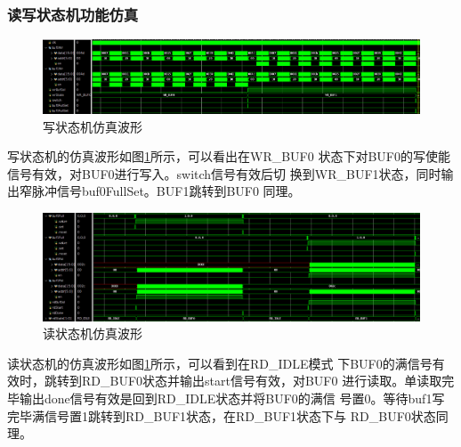 \documentclass{article}
\numberwithin {equation}{section}
\begin{document}
\begin{spacing}{1.25}
    \subsubsection{读写状态机功能仿真}
      \vspace{1em}
      \begin{figure}[H]
        \centering
        \includegraphics[scale=0.25]{./pictures/wrFSMSim.png}
        \caption{写状态机仿真波形}
        \label{WRFSMSimWave}
      \end{figure}
      写状态机的仿真波形如图\ref{WRFSMSimWave}所示，可以看出在WR\_BUF0
      状态下对BUF0的写使能信号有效，对BUF0进行写入。switch信号有效后切
      换到WR\_BUF1状态，同时输出窄脉冲信号buf0FullSet。BUF1跳转到BUF0
      同理。
      
      \begin{figure}[H]
        \centering
        \includegraphics[scale=0.25]{./pictures/rdFSMSim.png}
        \caption{读状态机仿真波形}
        \label{RdFSMSimWave}
      \end{figure}
      读状态机的仿真波形如图\ref{WRFSMSimWave}所示，可以看到在RD\_IDLE模式
      下BUF0的满信号有效时，跳转到RD\_BUF0状态并输出start信号有效，对BUF0
      进行读取。单读取完毕输出done信号有效是回到RD\_IDLE状态并将BUF0的满信
      号置0。等待buf1写完毕满信号置1跳转到RD\_BUF1状态，在RD\_BUF1状态下与
      RD\_BUF0状态同理。

\end{spacing}
\end{document}

